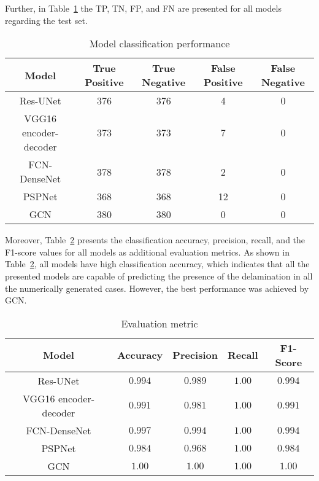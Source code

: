 Further, in Table~\ref{tab:table_performance} the TP, TN, FP, and FN are presented for all models regarding the test set. 
\begin{table}[]
	\centering
	\caption{Model classification performance}
	\label{tab:table_performance}
	\resizebox{\textwidth}{!}
	{
		\begin{tabular}{ccccc} \hline
			Model& True Positive & True Negative & False Positive & False Negative \\ \hline
			Res-UNet & 376 & 376 & 4 & 0 \\ 
			VGG16 encoder-decoder & 373 & 373 & 7 & 0 \\ 
			FCN-DenseNet & 378 & 378 & 2 & 0 \\ 
			PSPNet & 368 & 368 & 12 & 0 \\ 
			GCN & 380 & 380 & 0 & 0 \\ \hline
		\end{tabular}
	}
\end{table}
Moreover, Table~\ref{tab:evaluation_metric} presents the classification accuracy, precision, recall, and the F1-score values for all models as additional evaluation metrics.
As shown in Table~\ref{tab:evaluation_metric}, all models have high classification accuracy, which indicates that all the presented models are capable of predicting the presence of the delamination in all the numerically generated cases. 
However, the best performance was achieved by GCN.
\begin{table}[]
	\centering
	\caption{Evaluation metric}
	\label{tab:evaluation_metric}
	\resizebox{\textwidth}{!}
	{
		\begin{tabular}{ccccc} \hline
			Model& Accuracy & Precision & Recall & F1-Score \\ \hline
			Res-UNet & \(0.994\)  & \(0.989\) &  \(1.00\)  & \(0.994\)  \\ 
			VGG16 encoder-decoder & \(0.991\)  & \(0.981\) & \(1.00\) &  \(0.991\)\\ 
			FCN-DenseNet & \(0.997\)  & \(0.994\) & \(1.00\)  & \(0.994\) \\ 
			PSPNet & \(0.984\) & \(0.968\) & \(1.00\) & \(0.984\) \\ 
			GCN & \(1.00\) & \(1.00\) & \(1.00\) & \(1.00\) \\ \hline
		\end{tabular}
	}
\end{table}
